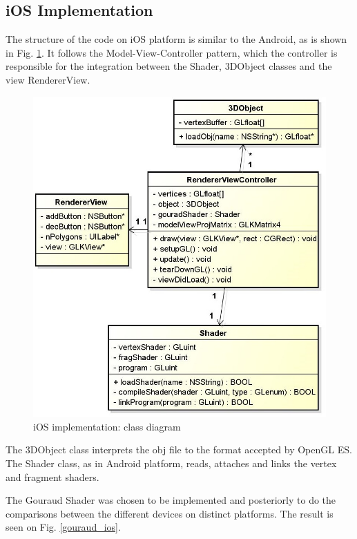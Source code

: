 \documentclass[10pt, conference, compsocconf]{IEEEtran}
\begin{document}
\subsection{iOS Implementation}
\label{sec:ios}

The structure of the code on iOS platform is similar to the Android, as is 
shown in Fig. \ref{ios_diag}. It follows the Model-View-Controller pattern, which the
controller is responsible for the integration between the Shader, 3DObject
classes and the view RendererView. 

	\begin{figure}[!t]
	\centering
		\includegraphics[keepaspectratio=true,scale=0.41]{ios_class_diagram.jpg}
	\caption{iOS implementation: class diagram}
	\label{ios_diag}
	\end{figure}

 The 3DObject class interprets the obj file to the format accepted by OpenGL ES. The Shader class, as in Android platform, reads, attaches and links the vertex
and fragment shaders. 

 The Gouraud Shader was chosen to be implemented and posteriorly to do the
comparisons between the different devices on distinct platforms. The result is seen on Fig. \ref{gouraud_ios}.
\end{document}
